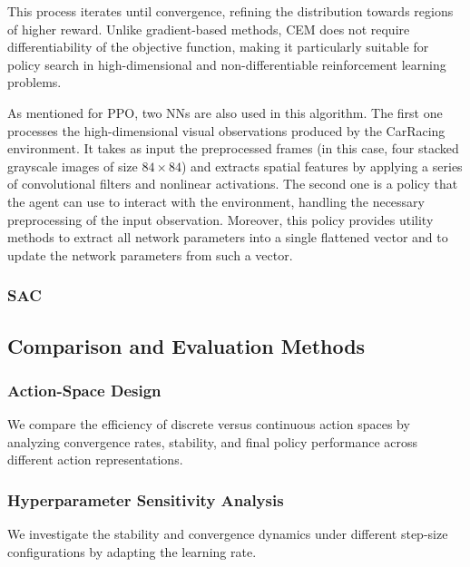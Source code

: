 \documentclass[../CSC_52081_EP.tex]{subfiles}
\begin{document}
This process iterates until convergence, refining the distribution towards regions of higher reward. Unlike gradient-based methods, CEM does not require differentiability of the objective function, making it particularly suitable for policy search in high-dimensional and non-differentiable reinforcement learning problems.

As mentioned for PPO, two NNs are also used in this algorithm. The first one processes the high-dimensional visual observations produced by the CarRacing environment. It takes as input the preprocessed frames (in this case, four stacked grayscale images of size \(84 \times 84\)) and extracts spatial features by applying a series of convolutional filters and nonlinear activations. The second one is a policy that the agent can use to interact with the environment, handling the necessary preprocessing of the input observation. Moreover, this policy provides utility methods to extract all network parameters into a single flattened vector and to update the network parameters from such a vector.

\hspace{1cm}
\subsubsection{SAC}



\subsection{Comparison and Evaluation Methods}

\subsubsection{Action-Space Design}
We compare the efficiency of discrete versus continuous action spaces by analyzing convergence rates, stability, and final policy performance across different action representations.

\subsubsection{Hyperparameter Sensitivity Analysis}
We investigate the stability and convergence dynamics under different step-size configurations by adapting the learning rate.
\end{document}

